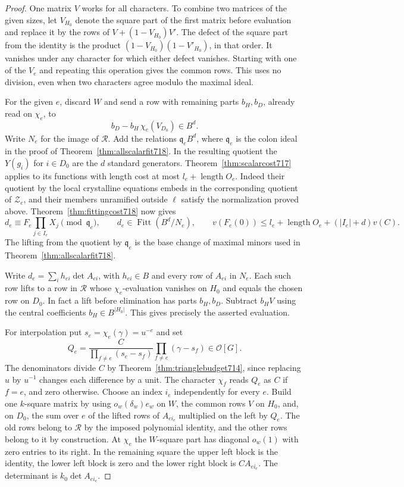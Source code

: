 \documentclass[a4paper,11pt]{article}
\theoremstyle{definition}
\theoremstyle{remark}
\newcommand{\len}{\operatorname{length}}\newcommand{\Res}{\operatorname*{Res}}
\numberwithin{equation}{section}
\begin{document}
\begin{proof}
One matrix \(V\) works for all characters. To combine two
matrices of the given sizes, let \(V_{H_0}\) denote the square
part of the first matrix before evaluation and replace it by
the rows of \(V+(1-V_{H_0})V'\). The defect of the square part
from the identity is the product
\((1-V_{H_0})(1-V'_{H_0})\), in that order. It vanishes under
any character for which either defect vanishes. Starting with
one of the \(V_e\) and repeating this operation gives the common
rows. This uses no division, even when two characters agree
modulo the maximal ideal.

For the given \(e\), discard \(W\) and send a row with remaining
parts \(b_H,b_D\), already read on \(\chi_e\), to
\[
                   b_D-b_H\,\chi_e(V_{D_0})\in B^d .
\]
Write \(N_e\) for the image of \(\mathcal R\). Add the relations
\(\mathfrak q_eB^d\), where \(\mathfrak q_e\) is the colon ideal
in the proof of Theorem~\ref{thm:allscalarfit718}.
In the resulting quotient the \(Y(g_i)\) for \(i\in D_0\)
are the \(d\) standard generators. Theorem~\ref{thm:scalarcost717}
applies to its functions with length cost at most \(l_e+\len O_e\).
Indeed their quotient by the local crystalline equations embeds
in the corresponding quotient of \(\mathcal Z_e\), and their
members unramified outside \(\ell\) satisfy the normalization
proved above. Theorem~\ref{thm:fittingcost718} now gives
\[
  d_e\equiv F_e\prod_{j\in I_e}X_j\pmod{\mathfrak q_e},\qquad
  d_e\in\operatorname{Fitt}(B^d/N_e),\qquad
  v(F_e(0))\le l_e+\len O_e+(|I_e|+d)v(C).
\]
The lifting from the quotient by \(\mathfrak q_e\) is the base
change of maximal minors used in Theorem~\ref{thm:allscalarfit718}.

Write \(d_e=\sum_i h_{ei}\det A_{ei}\), with \(h_{ei}\in B\)
and every row of \(A_{ei}\) in \(N_e\). Each such row lifts to
a row in \(\mathcal R\) whose \(\chi_e\)-evaluation vanishes on
\(H_0\) and equals the chosen row on \(D_0\). In fact a lift
before elimination has parts \(b_H,b_D\). Subtract \(b_H V\)
using the central coefficients \(b_H\in B^{|H_0|}\). This
gives precisely the asserted evaluation.

For interpolation put \(s_e=\chi_e(\gamma)=u^{-e}\) and set
\[
        Q_e=\frac{C}{\prod_{f\ne e}(s_e-s_f)}
                  \prod_{f\ne e}(\gamma-s_f)\in\mathcal O[G].
\]
The denominators divide \(C\) by
Theorem~\ref{thm:trianglebudget714}, since replacing \(u\)
by \(u^{-1}\) changes each difference by a unit. The character
\(\chi_f\) reads \(Q_e\) as \(C\) if \(f=e\), and zero otherwise.
Choose an index \(i_e\) independently for every \(e\). Build
one \(k\)-square matrix by using \(o_w(\delta_w)e_w\) on \(W\),
the common rows \(V\) on \(H_0\), and, on \(D_0\), the sum
over \(e\) of the lifted rows of \(A_{e i_e}\) multiplied on
the left by \(Q_e\). The old rows belong to \(\mathcal R\) by
the imposed polynomial identity, and the other rows belong
to it by construction. At \(\chi_e\) the \(W\)-square part
has diagonal \(o_w(1)\) with zero entries to its right. In
the remaining square the upper left block is the identity,
the lower left block is zero and the lower right block is
\(C A_{e i_e}\). The determinant is \(k_0\det A_{e i_e}\).


\end{proof}
\end{document}
